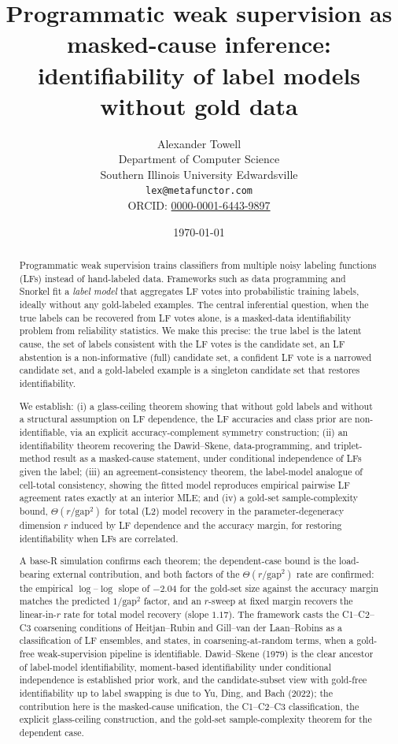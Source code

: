 \documentclass[11pt,letterpaper]{article}
\title{Programmatic weak supervision as masked-cause inference:\\
       identifiability of label models without gold data}
\author{
  Alexander Towell \\
  Department of Computer Science \\
  Southern Illinois University Edwardsville \\
  \texttt{lex@metafunctor.com} \\
  ORCID: \href{https://orcid.org/0000-0001-6443-9897}{0000-0001-6443-9897}
}
\date{\today}
\theoremstyle{plain}
\theoremstyle{definition}
\theoremstyle{remark}
\newcommand{\1}{\mathbf{1}}
\begin{document}
\maketitle

\begin{abstract}
Programmatic weak supervision trains classifiers from multiple noisy
labeling functions (LFs) instead of hand-labeled data. Frameworks
such as data programming and Snorkel fit a \emph{label model} that
aggregates LF votes into probabilistic training labels, ideally
without any gold-labeled examples. The central inferential question,
when the true labels can be recovered from LF votes alone, is a
masked-data identifiability problem from reliability statistics. We
make this precise: the true label is the latent cause, the set of
labels consistent with the LF votes is the candidate set, an LF
abstention is a non-informative (full) candidate set, a confident LF
vote is a narrowed candidate set, and a gold-labeled example is a
singleton candidate set that restores identifiability.

We establish: (i) a glass-ceiling theorem showing that without gold
labels and without a structural assumption on LF dependence, the LF
accuracies and class prior are non-identifiable, via an explicit
accuracy-complement symmetry construction; (ii) an identifiability
theorem recovering the Dawid--Skene, data-programming, and
triplet-method result as a masked-cause statement, under conditional
independence of LFs given the label; (iii) an agreement-consistency
theorem, the label-model analogue of cell-total consistency, showing
the fitted model reproduces empirical pairwise LF agreement rates
exactly at an interior MLE; and (iv) a gold-set sample-complexity
bound, $\Theta(r / \mathrm{gap}^2)$ for total (L2) model recovery in
the parameter-degeneracy dimension $r$ induced by LF dependence and
the accuracy margin, for restoring identifiability when LFs are
correlated.

A base-R simulation confirms each theorem; the dependent-case bound
is the load-bearing external contribution, and both factors of the
$\Theta(r/\mathrm{gap}^2)$ rate are confirmed: the empirical
$\log$--$\log$ slope of $-2.04$ for the gold-set size against the
accuracy margin matches the predicted $1/\mathrm{gap}^2$ factor, and an
$r$-sweep at fixed margin recovers the linear-in-$r$ rate for total
model recovery (slope $1.17$). The framework casts the
C1--C2--C3 coarsening conditions of
Heitjan--Rubin and Gill--van der Laan--Robins as a classification of
LF ensembles, and states, in coarsening-at-random terms, when a
gold-free weak-supervision pipeline is identifiable. Dawid--Skene
(1979) is the clear ancestor of label-model identifiability,
moment-based identifiability under conditional independence is
established prior work, and the candidate-subset view with gold-free
identifiability up to label swapping is due to Yu, Ding, and Bach
(2022); the contribution here is the masked-cause
unification, the C1--C2--C3 classification, the explicit
glass-ceiling construction, and the gold-set sample-complexity
theorem for the dependent case.
\end{abstract}












\end{document}
